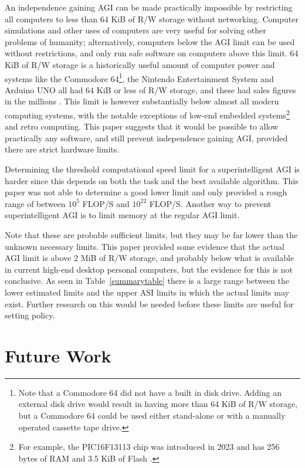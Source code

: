 \documentclass[letterpaper,twocolumn]{article}
\begin{document}
An independence gaining AGI can be made practically impossible by
restricting all computers to less than 64 KiB of R/W storage without
networking. Computer simulations and other uses of computers are very
useful for solving other problems of humanity; alternatively,
computers below the AGI limit can be used without restrictions, and
only run safe software on computers above this limit. 64 KiB of R/W
storage is a historically useful amount of computer power and systems
like the Commodore 64\footnote{Note that a Commodore 64 did not have a
built in disk drive. Adding an external disk drive would result in
having more than 64 KiB of R/W storage, but a Commodore 64 could be
used either stand-alone or with a manually operated cassette tape
drive.}, the Nintendo Entertainment System and Arduino UNO all had 64
KiB or less of R/W storage, and these had sales figures in the millions
\citep{game_console_2, arduinoUnoAnnounce}. This limit is however
substantially below almost all modern computing systems, with the
notable exceptions of low-end embedded systems\footnote{For example,
the PIC16F13113 chip was introduced in 2023 and has 256 bytes of RAM
and 3.5 KiB of Flash \citep{pic16f13145}.} and retro computing. This
paper suggests that it would be possible to allow practically any
software, and still prevent independence gaining AGI, provided there
are strict hardware limits.

Determining the threshold computational speed limit for a
superintelligent AGI is harder since this depends on both the task and
the best available algorithm. This paper was not able to determine a
good lower limit and only provided a rough range of between $10^5$
FLOP/S and $10^{22}$ FLOP/S. Another way to prevent superintelligent
AGI is to limit memory at the regular AGI limit.

Note that these are probable sufficient limits, but they may be far lower than
the unknown necessary limits.  This paper provided some evidence that
the actual AGI limit is above 2 MiB of R/W storage, and probably below
what is available in current high-end desktop personal computers, but
the evidence for this is not conclusive. As seen in
Table~\ref{summarytable} there is a large range between the lower
estimated limits and the upper ASI limits in which the actual limits
may exist. Further research on this would be needed before these
limits are useful for setting policy.

\section{Future Work}
\end{document}
